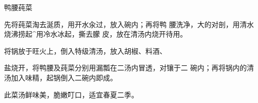 \begin{recipe}{鸭腰莼菜}

\ingredients


\cooking

\step 	先将莼菜淘去涎质，用开水汆过，放入碗内；再将鸭 腰洗净，大的对剖，用清水烧沸捞起^用冷水冰起，撕去朦 皮，放在清汤内烧开待用。

\step 	将锅放于旺火上，倒入特级清汤，放入胡椒、料酒、

盐烧开，将鸭腰及莼菜分别用漏瓢在二汤内冒透，对镶于二 碗内；再将锅内的清汤加入味精，起锅倒入二碗内即成。

\notes

此菜汤鲜味美，脆嫩叮口，适宜春夏二季。

\end{recipe}

